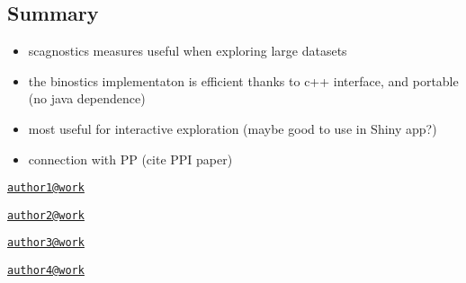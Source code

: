 \hypertarget{summary}{%
\subsection{Summary}\label{summary}}

\begin{itemize}
\tightlist
\item
  scagnostics measures useful when exploring large datasets
\item
  the binostics implementaton is efficient thanks to c++ interface, and
  portable (no java dependence)
\item
  most useful for interactive exploration (maybe good to use in Shiny
  app?)
\item
  connection with PP (cite PPI paper)
\end{itemize}




\address{%
Ursula Laa\\
Affiliation\\
line 1\\ line 2\\
}
\href{mailto:author1@work}{\nolinkurl{author1@work}}

\address{%
Dianne Cook\\
Affiliation\\
line 1\\ line 2\\
}
\href{mailto:author2@work}{\nolinkurl{author2@work}}

\address{%
Hadley Wickham\\
Affiliation\\
line 1\\ line 2\\
}
\href{mailto:author3@work}{\nolinkurl{author3@work}}

\address{%
Heike Hofmann\\
Affiliation\\
line 1\\ line 2\\
}
\href{mailto:author4@work}{\nolinkurl{author4@work}}


